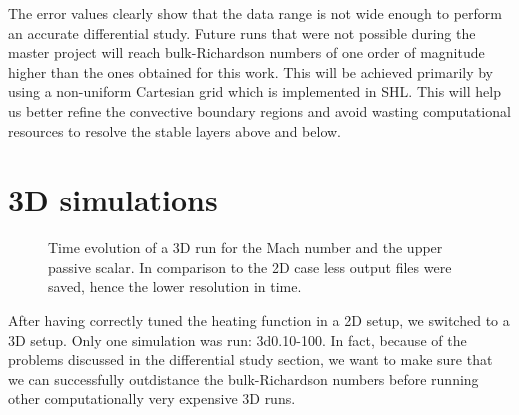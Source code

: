 The error values clearly show that the data range is not wide enough to perform an accurate differential study. Future runs that were not possible during the master project will reach bulk-Richardson numbers of one order of magnitude higher than the ones obtained for this work. This will be achieved primarily by using a non-uniform Cartesian grid which is implemented in SHL. This will help us better refine the convective boundary regions and avoid wasting computational resources to resolve the stable layers above and below.

\section{3D simulations}
\begin{figure}[b!]
      \centering
     \centering
	\hfill
	\caption{Time evolution of a 3D run for the Mach number and the upper passive scalar. In comparison to the 2D case less output files were saved, hence the lower resolution in time.}
	\label{fig:3dsingle}
\end{figure}
After having correctly tuned the heating function in a 2D setup, we switched to a 3D setup. Only one simulation was run: 3d0.10-100. In fact, because of the problems discussed in the differential study section, we want to make sure that we can successfully outdistance the bulk-Richardson numbers before running other computationally very expensive 3D runs.


